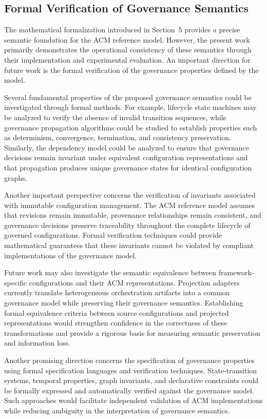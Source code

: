 \documentclass[10pt]{article}
\begin{document}
\subsection{Formal Verification of Governance Semantics}

The mathematical formalization introduced in Section~5 provides a precise semantic foundation for the ACM reference model. However, the present work primarily demonstrates the operational consistency of these semantics through their implementation and experimental evaluation. An important direction for future work is the formal verification of the governance properties defined by the model.

Several fundamental properties of the proposed governance semantics could be investigated through formal methods. For example, lifecycle state machines may be analyzed to verify the absence of invalid transition sequences, while governance propagation algorithms could be studied to establish properties such as determinism, convergence, termination, and consistency preservation. Similarly, the dependency model could be analyzed to ensure that governance decisions remain invariant under equivalent configuration representations and that propagation produces unique governance states for identical configuration graphs.

Another important perspective concerns the verification of invariants associated with immutable configuration management. The ACM reference model assumes that revisions remain immutable, provenance relationships remain consistent, and governance decisions preserve traceability throughout the complete lifecycle of governed configurations. Formal verification techniques could provide mathematical guarantees that these invariants cannot be violated by compliant implementations of the governance model.

Future work may also investigate the semantic equivalence between framework-specific configurations and their ACM representations. Projection adapters currently translate heterogeneous orchestration artifacts into a common governance model while preserving their governance semantics. Establishing formal equivalence criteria between source configurations and projected representations would strengthen confidence in the correctness of these transformations and provide a rigorous basis for measuring semantic preservation and information loss.

Another promising direction concerns the specification of governance properties using formal specification languages and verification techniques. State-transition systems, temporal properties, graph invariants, and declarative constraints could be formally expressed and automatically verified against the governance model. Such approaches would facilitate independent validation of ACM implementations while reducing ambiguity in the interpretation of governance semantics.
\end{document}
